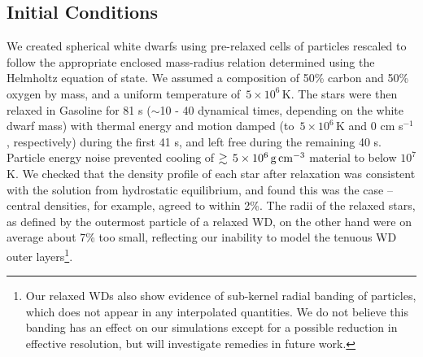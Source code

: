 
\subsection{Initial Conditions}
\label{ssec:initcond}

We created spherical white dwarfs using pre-relaxed cells of particles rescaled to follow the appropriate enclosed mass-radius relation determined using the Helmholtz equation of state.  We assumed a composition of 50\% carbon and 50\% oxygen by mass, and a uniform temperature of~$5\times10^6\,$K.  The stars were then relaxed in Gasoline for 81 s ($\sim$10 - 40 dynamical times, depending on the white dwarf mass) with thermal energy and motion damped (to~$5\times10^6\,$K and 0 cm s$^{-1}$, respectively) during the first 41 s, and left free during the remaining 40 s.  Particle energy noise prevented cooling of $\gtrsim\,5\times10^6\,\gcc$ material to below $10^7$ K.  We checked that the density profile of each star after relaxation was consistent with the solution from hydrostatic equilibrium, and found this was the case -- central densities, for example, agreed to within 2\%.  The radii of the relaxed stars, as defined by the outermost particle of a relaxed WD, on the other hand were on average about 7\% too small, reflecting our inability to model the tenuous WD outer layers\footnote{Our relaxed WDs also show evidence of sub-kernel radial banding of particles, which does not appear in any interpolated quantities.  We do not believe this banding has an effect on our simulations except for a possible reduction in effective resolution, but will investigate remedies in future work.}.

